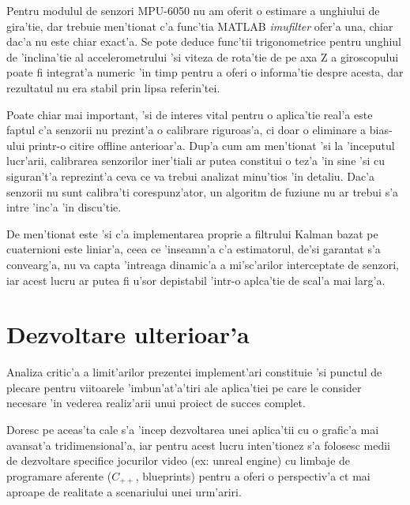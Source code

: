 \documentclass[12pt,a4paper,twoside]{report}
\begin{document}
\vspace{5px}

Pentru modulul de senzori MPU-6050 nu am oferit o estimare a unghiului de gira'tie, dar trebuie men'tionat c'a func'tia MATLAB \textit{imufilter} ofer'a una, chiar dac'a nu este chiar exact'a. Se pote deduce func'tii trigonometrice pentru unghiul de 'inclina'tie al accelerometrului 'si viteza de rota'tie de pe axa Z a giroscopului poate fi integrat'a numeric 'in timp pentru a oferi o informa'tie despre acesta, dar rezultatul nu era stabil prin lipsa referin'tei. 

\vspace{5px}

Poate chiar mai important, 'si de interes vital pentru o aplica'tie real'a este faptul c'a senzorii nu prezint'a o calibrare riguroas'a, ci doar o eliminare a bias-ului printr-o citire offline anterioar'a. Dup'a cum am men'tionat 'si la 'inceputul lucr'arii, calibrarea senzorilor iner'tiali ar putea constitui o tez'a 'in sine 'si cu siguran't'a reprezint'a ceva ce va trebui analizat minu'tios 'in detaliu. Dac'a senzorii nu sunt calibra'ti corespunz'ator, un algoritm de fuziune nu ar trebui s'a intre 'inc'a 'in discu'tie.

\vspace{5px}

De men'tionat este 'si c'a implementarea proprie a filtrului Kalman bazat pe cuaternioni este liniar'a, ceea ce 'inseamn'a c'a estimatorul, de'si garantat s'a convearg'a, nu va capta 'intreaga dinamic'a a mi'sc'arilor interceptate de senzori, iar acest lucru ar putea fi u'sor depistabil 'intr-o aplca'tie de scal'a mai larg'a. 

\section{Dezvoltare ulterioar'a}

Analiza critic'a a limit'arilor prezentei implement'ari constituie 'si punctul de plecare pentru viitoarele 'imbun'at'a'tiri ale aplica'tiei pe care le consider necesare 'in vederea realiz'arii unui proiect de succes complet. 

\vspace{5px}

Doresc pe aceas'ta cale s'a 'incep dezvoltarea unei aplica'tii cu o grafic'a mai avansat'a tridimensional'a, iar pentru acest lucru inten'tionez s'a folosesc medii de dezvoltare specifice jocurilor video (ex: unreal engine) cu limbaje de programare aferente ($C_{++}$, blueprints) pentru a oferi o perspectiv'a c\ia t mai aproape de realitate a scenariului unei urm'ariri. 
\end{document}
